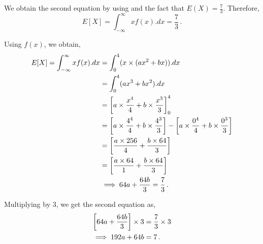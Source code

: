 \begin{subquestions}
\begin{subsubquestions}
We obtain the second equation by using  and the fact that $E(X) = \frac{7}{3}$. Therefore,
\begin{equation}
		E[X] = \int_{-\infty}^{\infty}x f(x).dx = \frac{7}{3}\,.
\end{equation}

Using $f(x)$, we obtain,
\begin{align}
	E[X] = \int_{-\infty}^{\infty}x f(x).dx & = \int_{0}^{4} (x \times (ax^2 +bx)).dx \nonumber \\
	                                        & = \int_{0}^{4} (ax^3 +bx^2).dx \nonumber \\
	                                        & = \left[a \times \frac{x^4}{4} + b \times \frac{x^3}{3} \right]^{4}_{0} \nonumber \\
	                                        & = \left[a \times \frac{4^4}{4} + b \times \frac{4^3}{3} \right] - \left[a \times \frac{0^4}{4} + b \times \frac{0^3}{3} \right] \nonumber \\
	                                        & = \left[\frac{a \times 256}{4} + \frac{b \times 64}{3} \right] \nonumber \\
	                                        & = \left[\frac{a \times 64}{1} + \frac{b \times 64}{3} \right] \nonumber \\
	                                        & \implies 64a + \frac{64b}{3} = \frac{7}{3} \,. \label{2012:q3:CRV2}
\end{align}

Multiplying  by 3, we get the second equation as,
\begin{align}
		\left[64a + \frac{64b}{3} \right] \times 3  & = \frac{7}{3} \times 3 \nonumber \\
		 \implies 192a + 64b & = 7 \,. \label{2012:q3:CRV3}
\end{align}


\end{subsubquestions}
\end{subquestions}
